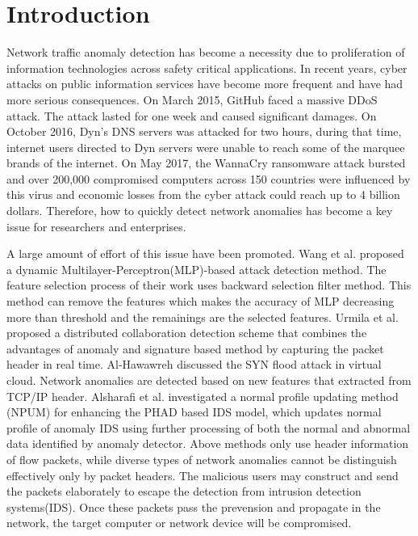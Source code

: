 \documentclass{ieeeaccess}
\theoremstyle{definition}
\begin{document}
\maketitle

\section{Introduction}
\label{sec:introduction}
Network traffic anomaly detection has become a necessity due to proliferation of information technologies across safety critical applications. In recent years, cyber attacks on public information services have become more frequent and have had more serious consequences.
On March 2015, GitHub faced a massive DDoS attack. The attack lasted for one week and caused significant damages\cite{github-2015}. On October 2016, Dyn's DNS servers was attacked for two hours, during that time, internet users directed to Dyn servers were unable to reach some of the marquee brands of the internet\cite{dyn-2016}. On May 2017, the WannaCry ransomware attack bursted and over 200,000 compromised computers across 150 countries were influenced by this virus and economic losses from the cyber attack could reach up to 4 billion dollars\cite{wannacry-2017}.
Therefore, how to quickly detect network anomalies has become a key issue for researchers and enterprises.

A large amount of effort of this issue have been promoted.
Wang et al.\cite{Wang2020CS} proposed a dynamic Multilayer-Perceptron(MLP)-based attack detection method. The feature selection process of their work uses backward selection filter method. This method can remove the features which makes the accuracy of MLP decreasing more than threshold and the remainings are the selected features. Urmila et al.\cite{Urmila2017} proposed a distributed collaboration detection scheme that combines the advantages of anomaly and signature based method by capturing the packet header in real time. Al-Hawawreh\cite{MunaSulieman2017} discussed the SYN flood attack in virtual cloud. Network anomalies are detected based on new features that extracted from TCP/IP header. Alsharafi et al.\cite{Alsharafi2020} investigated a normal profile updating method (NPUM) for enhancing the PHAD based IDS model, which updates normal profile of anomaly IDS using further processing of both the normal and abnormal data identified by anomaly detector. 
Above methods only use header information of flow packets, while diverse types of network anomalies cannot be distinguish effectively only by packet headers. The malicious users may construct and send the packets elaborately to escape the detection from intrusion detection systems(IDS). Once these packets pass the prevension and propagate in the network, the target computer or network device will be compromised.
\end{document}

